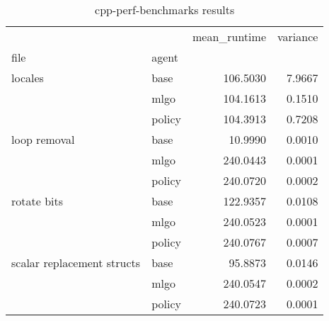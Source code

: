\begin{table}[h]
    \caption{cpp-perf-benchmarks results}
    \label{table:cpp-perf-benchmarks}
    \begin{tabular}{llrr}
\toprule
                           &        &  mean\_runtime &  variance \\
file & agent &               &           \\
\midrule
locales & base &      106.5030 &    7.9667 \\
                           & mlgo &      104.1613 &    0.1510 \\
                           & policy &      104.3913 &    0.7208 \\
loop removal & base &       10.9990 &    0.0010 \\
                           & mlgo &      240.0443 &    0.0001 \\
                           & policy &      240.0720 &    0.0002 \\
rotate bits & base &      122.9357 &    0.0108 \\
                           & mlgo &      240.0523 &    0.0001 \\
                           & policy &      240.0767 &    0.0007 \\
scalar replacement structs & base &       95.8873 &    0.0146 \\
                           & mlgo &      240.0547 &    0.0002 \\
                           & policy &      240.0723 &    0.0001 \\
\bottomrule
\end{tabular}
\end{table}
